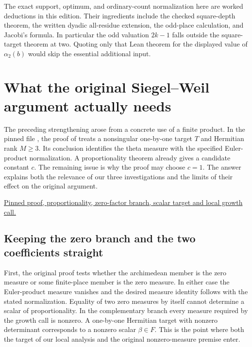 \documentclass[12pt,letterpaper]{article}
\newcommand{\code}[1]{\texttt{\detokenize{#1}}}
\begin{document}
The exact support, optimum, and ordinary-count normalization here are worked deductions in this edition. Their ingredients include the checked square-depth theorem, the written dyadic all-residue extension, the odd-place calculation, and Jacobi's formula. In particular the odd valuation $2k-1$ falls outside the square-target theorem at two. Quoting only that Lean theorem for the displayed value of $\alpha_2(b)$ would skip the essential additional input.

\section{What the original Siegel--Weil argument actually needs}\label{sec:consumer}
The preceding strengthening arose from a concrete use of a finite product. In the pinned file \code{SwOne.lean}, the proof of \code{sw_one} treats a nonsingular one-by-one target $T$ and Hermitian rank $M\ge3$. Its conclusion identifies the theta measure with the specified Euler-product normalization. A proportionality theorem already gives a candidate constant $c$. The remaining issue is why the proof may choose $c=1$. The answer explains both the relevance of our three investigations and the limits of their effect on the original argument.
\begin{flushleft}\small
\href{https://github.com/nousentllc/riemann-hypothesis/blob/40e56bab026552e089d7afcfeff08d2defb9c005/src/CompanionTheory/AutomorphicTheory/ThetaDilations/SwOne.lean#L23-L47}{Pinned proof, proportionality, zero-factor branch, scalar target and local growth call.}
\end{flushleft}

\subsection{Keeping the zero branch and the two coefficients straight}
First, the original proof tests whether the archimedean member is the zero measure or some finite-place member is the zero measure. In either case the Euler-product measure vanishes and the desired measure identity follows with the stated normalization. Equality of two zero measures by itself cannot determine a scalar of proportionality. In the complementary branch every measure required by the growth call is nonzero. A one-by-one Hermitian target with nonzero determinant corresponds to a nonzero scalar $\beta\in F$. This is the point where both the target of our local analysis and the original nonzero-measure premise enter.
\end{document}
